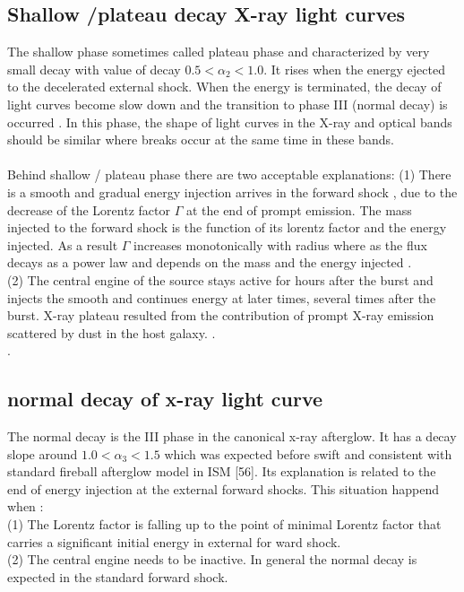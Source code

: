 \subsection{Shallow /plateau decay X-ray light curves }
The shallow  phase  sometimes called plateau phase and characterized by very small decay with value of decay  $0.5 < \alpha_{2} < 1.0 $. It rises when the energy ejected to the decelerated external shock. When the energy is terminated, the decay of light curves become slow down and the transition to phase III (normal decay) is occurred . In this phase, the shape of light curves in the X-ray and optical bands should be similar where breaks occur at the same time in these bands.\citep{38}\citep{39}\\\\
 Behind  shallow / plateau  phase   there   are  two  acceptable  explanations:  
(1) There is  a smooth and gradual energy injection  arrives in the forward shock ,  due to the decrease of the Lorentz factor $ \Gamma $ at the end of prompt emission. The mass injected to the forward shock is the function of its lorentz factor and the energy injected. As a result $ \Gamma $ increases monotonically with radius  where as  the flux decays as a power law and depends on the mass and the energy injected .\citep{40} \citep{41}\\ 
(2) The central engine of the source stays active for hours after the burst and injects the smooth and continues energy at later times, several times after the burst. X-ray plateau resulted  from  the contribution of prompt X-ray emission scattered by dust in the host galaxy. \citep{41}.\\\citep{42}.\\
\subsection{normal decay of x-ray light curve}
The  normal  decay  is  the  III   phase  in  the  canonical  x-ray  afterglow. It   has a decay  slope  around $1.0 < \alpha_{3} < 1.5$ which was expected before swift and  consistent  with  standard fireball afterglow model in ISM [56]. Its  explanation  is  related to the end  of energy injection at the external  forward shocks. This situation happend  when :\\
(1) The  Lorentz factor is  falling  up to the point of minimal Lorentz factor that carries a significant initial energy in  external for ward shock.\\ 
(2) The  central engine needs to be  inactive. In general the normal decay is expected in the standard forward shock.\citep{43}
